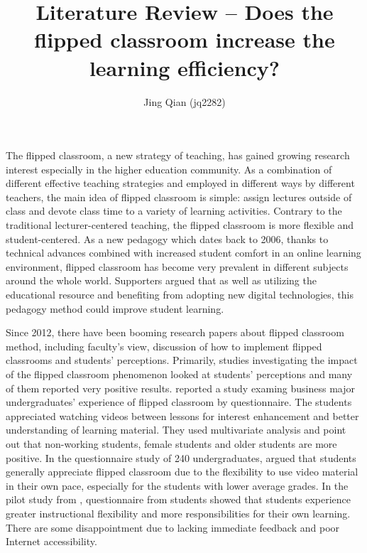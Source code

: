 \documentclass[11pt,a4paper]{article}
\title{Literature Review -- Does the flipped classroom increase the learning efficiency?}
\author{Jing Qian (jq2282)
  }
\date{}
\begin{document}
\maketitle


%
%

The flipped classroom, a new strategy of teaching, has gained growing research interest especially in the higher education community.
As a combination of different effective teaching strategies and employed
in different ways by different teachers, the main idea of flipped classroom is simple: assign lectures outside of class and
devote class time to a variety of learning activities\cite{DeLozier:2016}.
Contrary to the traditional lecturer-centered teaching, the flipped classroom is more flexible and student-centered. 
As a new pedagogy which dates back to 2006, thanks to technical advances combined with increased student comfort in an online learning environment, flipped classroom has become very prevalent in different subjects around the whole world.
Supporters argued that as well as utilizing the educational resource and benefiting from adopting new digital technologies, this pedagogy method could improve student learning\cite{Abeysekera:2015}.

Since 2012, there have been booming research papers about flipped classroom method, including faculty's view, discussion of how to implement flipped classrooms and students' perceptions.
Primarily, studies investigating the impact of the flipped classroom phenomenon  looked at students' perceptions and many of them reported very positive results.
\cite{Kurtz:2014} reported a study examing business major undergraduates' experience of flipped classroom by questionnaire. The students appreciated watching videos between lessons for interest enhancement and better understanding of learning material. They used multivariate analysis and point out that non-working students, female students and older students are more positive. 
In the questionnaire study of 240 undergraduates, \cite{Nouri:2016} argued that students generally appreciate flipped classroom due to the flexibility to use video material in their own pace, especially for the students with lower average grades.
In the pilot study from \cite{Gündüz:2019}, questionnaire from students showed that students experience greater instructional flexibility and more responsibilities for their own learning. There are some disappointment due to lacking immediate feedback and poor Internet accessibility.
\end{document}
